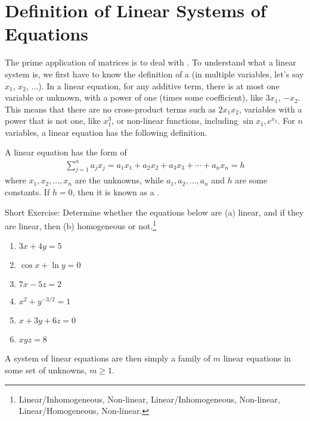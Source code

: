 \section{Definition of Linear Systems of Equations}
\label{section:deflinsys}
The prime application of matrices is to deal with . To understand what a linear system is, we first have to know the definition of a  (in multiple variables, let's say $x_1$, $x_2$, $\ldots$). In a linear equation, for any additive term, there is at most one variable or unknown, with a power of one (times some coefficient), like $3x_1$, $-x_2$. This means that there are no cross-product terms such as $2x_1x_2$, variables with a power that is not one, like $x_1^3$, or non-linear functions, including $\sin{x_1}, e^{x_2}$. For $n$ variables, a linear equation has the following definition.
\begin{defn}
A linear equation has the form of
\begin{align*}
\sum_{j=1}^n a_jx_j = a_1x_1 + a_2x_2 + a_3x_3 + \cdots + a_nx_n = h
\end{align*}
where $x_1, x_2, \ldots, x_n$ are the unknowns, while $a_1, a_2, \ldots, a_n$ and $h$ are some constants. If $h = 0$, then it is known as a .
\end{defn}
Short Exercise: Determine whether the equations below are (a) linear, and if they are linear, then (b) homogeneous or not.\footnote{Linear/Inhomogeneous, Non-linear, Linear/Inhomogeneous, Non-linear, Linear/Homogeneous, Non-linear.}
\begin{enumerate}
    \item $3x + 4y = 5$ 
    \item $\cos x + \ln y = 0$
    \item $7x - 5z = 2$ 
    \item $x^2 + y^{-3/2} = 1$
    \item $x + 3y + 6z = 0$
    \item $xyz = 8$ 
\end{enumerate}
A system of linear equations are then simply a family of $m$ linear equations in some set of unknowns, $m \geq 1$.
